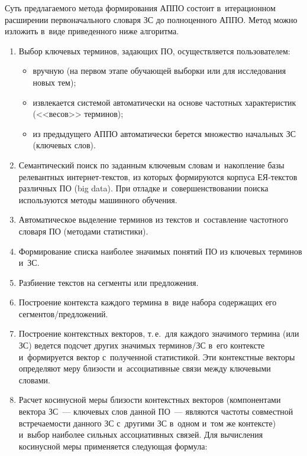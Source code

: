 \begin{multicols}{2}
     Суть предлагаемого метода формирования \mbox{АППО} состоит в~итерационном расширении первоначального словаря ЗС до полноценного
АППО. Метод можно изложить в~виде приведенного ниже алгоритма.
     \begin{enumerate}[1.]
     \item  Выбор ключевых терминов, задающих ПО,
осуществляется пользователем:
\begin{itemize}
\item вручную (на первом этапе обучающей
выборки или для исследования новых тем);
\item извлекается системой
автоматически на основе частотных характеристик (<<весов>> терминов);
\item  из предыдущего АППО автоматически берется множество
начальных ЗС (ключевых слов).
\end{itemize}
     \item Семантический поиск по заданным ключевым словам и~накопление базы релевантных ин\-тер\-нет-текс\-тов, из которых
формируются корпуса ЕЯ-текс\-тов различных ПО (big data). При отладке и~совершенствовании поиска используются методы машинного обучения.
     \item Автоматическое выделение терминов из текстов и~составление
частотного словаря ПО (методами статистики).
     \item Формирование списка наиболее значимых понятий ПО из
ключевых терминов и~ЗС.
     \item Разбиение текстов на сегменты или предложения.
     \item Построение контекста каждого термина в~виде набора
содержащих его сегментов/предложений.
     \item Построение контекстных векторов, т.\,е.\ для каж\-до\-го значимого
термина (или ЗС) ведется подсчет других значимых терминов/ЗС в~его
контексте и~формируется вектор с~полученной статисти\-кой. Эти контекстные
векторы определяют меру близости и~ассоциативные связи между
ключевыми словами.
     \item Расчет косинусной меры близости контекстных векторов
(компонентами вектора ЗС~--- ключевых слов данной ПО~--- являются
частоты совместной встречаемости данного ЗС с~другими ЗС в~одном и~том
же контексте) и~выбор наиболее сильных ассоциативных связей. Для
вы\-чис\-ле\-ния косинусной меры применяется сле\-ду\-ющая формула:


\end{enumerate}
\end{multicols}
